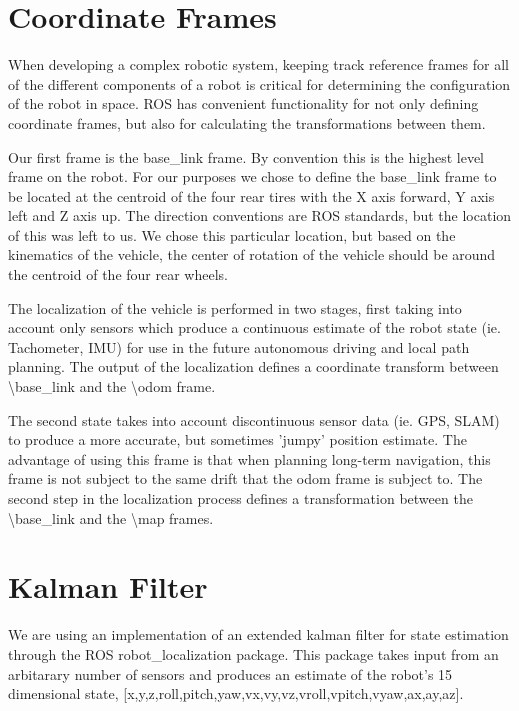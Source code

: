 \section{Coordinate Frames}

When developing a complex robotic system, keeping track reference frames for all of the different components of a robot is critical for determining the configuration of the robot in space. ROS has convenient functionality for not only defining coordinate frames, but also for calculating the transformations between them. 

Our first frame is the base\_link frame. By convention this is the highest level frame on the robot. For our purposes we chose to define the base\_link frame to be located at the centroid of the four rear tires with the X axis forward, Y axis left and Z axis up. The direction conventions are ROS standards, but the location of this was left to us. We chose this particular location, but based on the kinematics of the vehicle, the center of rotation of the vehicle should be around the centroid of the four rear wheels. 

The localization of the vehicle is performed in two stages, first taking into account only sensors which produce a continuous estimate of the robot state (ie. Tachometer, IMU) for use in the future autonomous driving and local path planning. The output of the localization defines a coordinate transform between \textbackslash base\_link and the \textbackslash odom frame.

The second state takes into account discontinuous sensor data (ie. GPS, SLAM) to produce a more accurate, but sometimes 'jumpy' position estimate. The advantage of using this frame is that when planning long-term navigation, this frame is not subject to the same drift that the odom frame is subject to. The second step in the localization process defines a transformation between the \textbackslash base\_link and the \textbackslash map frames.

\section{Kalman Filter}

We are using an implementation of an extended kalman filter for state estimation through the ROS robot\_localization package. This package takes input from an arbitarary number of sensors and produces an estimate of the robot's 15 dimensional state, [x,y,z,roll,pitch,yaw,vx,vy,vz,vroll,vpitch,vyaw,ax,ay,az]\cite{Moore2016}. 

